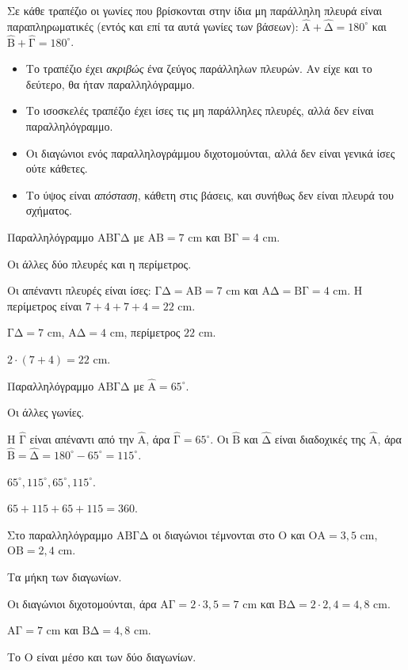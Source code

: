 Σε κάθε τραπέζιο οι γωνίες που βρίσκονται στην ίδια μη παράλληλη πλευρά είναι παραπληρωματικές (εντός και επί τα αυτά γωνίες των βάσεων): $\hat{\mathrm{Α}}+\hat{\mathrm{Δ}}=180^\circ$ και $\hat{\mathrm{Β}}+\hat{\mathrm{Γ}}=180^\circ$.

\begin{prosoxi}
\begin{itemize}[leftmargin=1.2em,itemsep=0.3ex,topsep=2pt]
\item Το τραπέζιο έχει \emph{ακριβώς} ένα ζεύγος παράλληλων πλευρών. Αν είχε και το δεύτερο, θα ήταν παραλληλόγραμμο.
\item Το ισοσκελές τραπέζιο έχει ίσες τις μη παράλληλες πλευρές, αλλά δεν είναι παραλληλόγραμμο.
\item Οι διαγώνιοι ενός παραλληλογράμμου διχοτομούνται, αλλά δεν είναι γενικά ίσες ούτε κάθετες.
\item Το ύψος είναι \emph{απόσταση}, κάθετη στις βάσεις, και συνήθως δεν είναι πλευρά του σχήματος.
\end{itemize}
\end{prosoxi}


\tixero Παραλληλόγραμμο $\mathrm{ΑΒΓΔ}$ με $\mathrm{ΑΒ}=7$ cm και $\mathrm{ΒΓ}=4$ cm.\par
\tithelo Οι άλλες δύο πλευρές και η περίμετρος.\par
\possindeo Οι απέναντι πλευρές είναι ίσες: $\mathrm{ΓΔ}=\mathrm{ΑΒ}=7$ cm και $\mathrm{ΑΔ}=\mathrm{ΒΓ}=4$ cm. Η περίμετρος είναι $7+4+7+4=22$ cm.\par
\apantisi $\mathrm{ΓΔ}=7$ cm, $\mathrm{ΑΔ}=4$ cm, περίμετρος $22$ cm.\par
\elegxos $2\cdot(7+4)=22$ cm.

\tixero Παραλληλόγραμμο $\mathrm{ΑΒΓΔ}$ με $\hat{\mathrm{Α}}=65^\circ$.\par
\tithelo Οι άλλες γωνίες.\par
\possindeo Η $\hat{\mathrm{Γ}}$ είναι απέναντι από την $\hat{\mathrm{Α}}$, άρα $\hat{\mathrm{Γ}}=65^\circ$. Οι $\hat{\mathrm{Β}}$ και $\hat{\mathrm{Δ}}$ είναι διαδοχικές της $\hat{\mathrm{Α}}$, άρα $\hat{\mathrm{Β}}=\hat{\mathrm{Δ}}=180^\circ-65^\circ=115^\circ$.\par
\apantisi $65^\circ,115^\circ,65^\circ,115^\circ$.\par
\elegxos $65+115+65+115=360$.

\tixero Στο παραλληλόγραμμο $\mathrm{ΑΒΓΔ}$ οι διαγώνιοι τέμνονται στο $\mathrm{Ο}$ και $\mathrm{ΟΑ}=3{,}5$ cm, $\mathrm{ΟΒ}=2{,}4$ cm.\par
\tithelo Τα μήκη των διαγωνίων.\par
\possindeo Οι διαγώνιοι διχοτομούνται, άρα $\mathrm{ΑΓ}=2\cdot3{,}5=7$ cm και $\mathrm{ΒΔ}=2\cdot2{,}4=4{,}8$ cm.\par
\apantisi $\mathrm{ΑΓ}=7$ cm και $\mathrm{ΒΔ}=4{,}8$ cm.\par
\elegxos Το $\mathrm{Ο}$ είναι μέσο και των δύο διαγωνίων.

